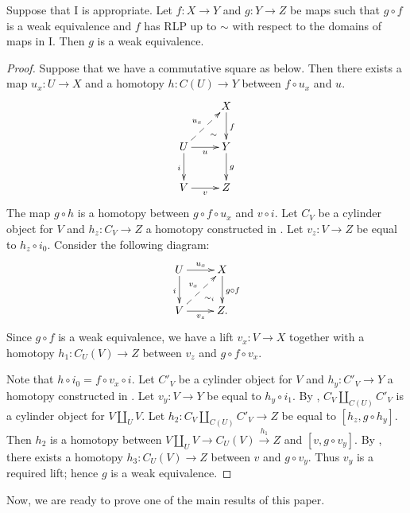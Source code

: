 \documentclass{amsart}
\theoremstyle{definition}
\newcommand{\I}{\mathrm{I}}
\newcommand{\cyli}{i}
\begin{document}
\begin{lem}
Suppose that $\I$ is appropriate.
Let $f : X \to Y$ and $g : Y \to Z$ be maps such that $g \circ f$ is a weak equivalence
and $f$ has RLP up to $\sim$ with respect to the domains of maps in $\I$.
Then $g$ is a weak equivalence.
\end{lem}
\begin{proof}
Suppose that we have a commutative square as below.
Then there exists a map $u_x : U \to X$ and a homotopy $h : C(U) \to Y$ between $f \circ u_x$ and $u$.
\[ \xymatrix{   \ar@{}[dr]|(.7){\sim}                 & X \ar[d]^f \\
              U \ar@{-->}[ur]^{u_x} \ar[d]_i \ar[r]_u & Y \ar[d]^g \\
              V \ar[r]_v                              & Z
            } \]
The map $g \circ h$ is a homotopy between $g \circ f \circ u_x$ and $v \circ i$.
Let $C_V$ be a cylinder object for $V$ and $h_z : C_V \to Z$ a homotopy constructed in .
Let $v_z : V \to Z$ be equal to $h_z \circ \cyli_0$.
Consider the following diagram:
\[ \xymatrix{ U \ar[r]^{u_x} \ar[d]_i \ar@{}[dr]|(.7){\sim_i} & X \ar[d]^{g \circ f} \\
              V \ar[r]_{v_z} \ar@{-->}[ur]^{v_x}              & Z.
            } \]
Since $g \circ f$ is a weak equivalence, we have a lift $v_x : V \to X$ together
with a homotopy $h_1 : C_U(V) \to Z$ between $v_z$ and $g \circ f \circ v_x$.

Note that $h \circ \cyli_0 = f \circ v_x \circ i$.
Let $C'_V$ be a cylinder object for $V$ and $h_y : C'_V \to Y$ a homotopy constructed in .
Let $v_y : V \to Y$ be equal to $h_y \circ \cyli_1$.
By , $C_V \amalg_{C(U)} C'_V$ is a cylinder object for $V \amalg_U V$.
Let $h_2 : C_V \amalg_{C(U)} C'_V \to Z$ be equal to $[h_z, g \circ h_y]$.
Then $h_2$ is a homotopy between $V \amalg_U V \to C_U(V) \overset{h_1}\to Z$ and $[v, g \circ v_y]$.
By , there exists a homotopy $h_3 : C_U(V) \to Z$ between $v$ and $g \circ v_y$.
Thus $v_y$ is a required lift; hence $g$ is a weak equivalence.
\end{proof}

Now, we are ready to prove one of the main results of this paper.
\end{document}

